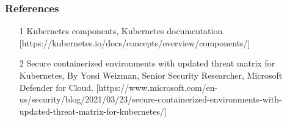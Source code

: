 \documentclass{beamer}
\begin{document}
\begin{frame}
\frametitle{References}

\begin{itemize}
  \item [1] Kubernetes components, Kubernetes documentation.
  [https://kubernetes.io/docs/concepts/overview/components/]
  \item [2] Secure containerized environments with updated threat matrix for Kubernetes, By Yossi Weizman, Senior Security Researcher, Microsoft Defender for Cloud.
  [https://www.microsoft.com/en-us/security/blog/2021/03/23/secure-containerized-environments-with-updated-threat-matrix-for-kubernetes/]
\end{itemize}
\end{frame}
\end{document}
